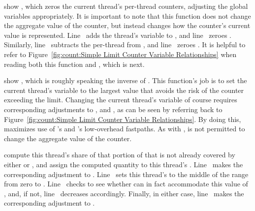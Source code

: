 \begin{lineref}
 show ,
which zeros the current thread's
per-thread counters, adjusting the global variables appropriately.
It is important to note that this function does not change the aggregate
value of the counter, but instead changes how the counter's current value
is represented.
Line~ adds the thread's  variable to ,
and line~ zeroes .
Similarly, line~ subtracts the per-thread  from
, and line~ zeroes .
It is helpful to refer to
Figure~\ref{fig:count:Simple Limit Counter Variable Relationships}
when reading both this function and , which is next.
\end{lineref}

\begin{lineref}
 show ,
which is roughly speaking
the inverse of .
This function's job is to set the current thread's
 variable to the largest value that avoids the risk
of the counter exceeding the  limit.
Changing the current thread's  variable of course
requires corresponding adjustments to , 
and , as can be seen by referring back to
Figure~\ref{fig:count:Simple Limit Counter Variable Relationships}.
By doing this,  maximizes use of
's and 's low-overhead fastpaths.
As with ,  is not permitted
to change the aggregate value of the counter.

 compute this thread's share of
that portion of
 that is not already covered by either
 or , and assign the
computed quantity to this thread's .
Line~ makes the corresponding adjustment to .
Line~ sets this thread's  to the middle of the range
from zero to .
Line~ checks to see whether  can in fact accommodate
this value of , and, if not,
line~ decreases 
accordingly.
Finally, in either case,
line~ makes the corresponding adjustment to
.
\end{lineref}

